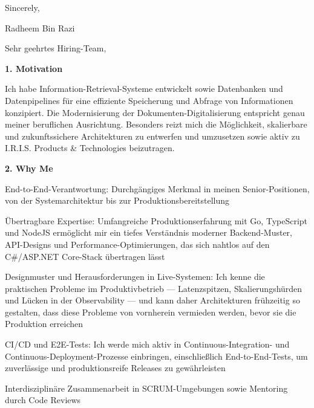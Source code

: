\documentclass[11pt,a4paper]{coverletter}
\begin{document}
\closing{Sincerely,}{Radheem Bin Razi}

\clearpage
{}


\opening{Sehr geehrtes Hiring-Team,}

\vspace{8pt}\noindent\textbf{1. Motivation}\par\vspace{3pt}

Ich habe Information-Retrieval-Systeme entwickelt sowie Datenbanken und Datenpipelines für eine effiziente Speicherung und Abfrage von Informationen konzipiert. Die Modernisierung der Dokumenten-Digitalisierung entspricht genau meiner beruflichen Ausrichtung. Besonders reizt mich die Möglichkeit, skalierbare und zukunftssichere Architekturen zu entwerfen und umzusetzen sowie aktiv zu I.R.I.S. Products \& Technologies beizutragen.

\vspace{8pt}\noindent\textbf{2. Why Me}\par\vspace{3pt}

\bullets

  \item End-to-End-Verantwortung: Durchgängiges Merkmal in meinen Senior-Positionen, von der Systemarchitektur bis zur Produktionsbereitstellung

  \item Übertragbare Expertise: Umfangreiche Produktionserfahrung mit Go, TypeScript und NodeJS ermöglicht mir ein tiefes Verständnis moderner Backend-Muster, API-Designs und Performance-Optimierungen, das sich nahtlos auf den C\#/ASP.NET Core-Stack übertragen lässt

  \item Designmuster und Herausforderungen in Live-Systemen: Ich kenne die praktischen Probleme im Produktivbetrieb — Latenzspitzen, Skalierungshürden und Lücken in der Observability — und kann daher Architekturen frühzeitig so gestalten, dass diese Probleme von vornherein vermieden werden, bevor sie die Produktion erreichen

  \item CI/CD und E2E-Tests: Ich werde mich aktiv in Continuous-Integration- und Continuous-Deployment-Prozesse einbringen, einschließlich End-to-End-Tests, um zuverlässige und produktionsreife Releases zu gewährleisten

  \item Interdisziplinäre Zusammenarbeit in SCRUM-Umgebungen sowie Mentoring durch Code Reviews
\end{document}
